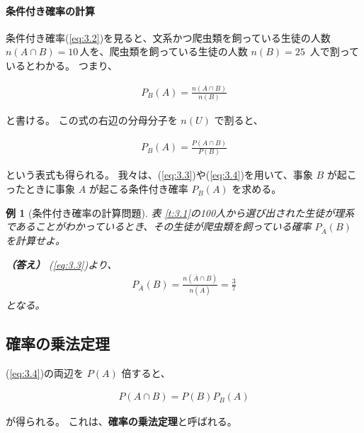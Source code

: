 \documentclass[12pt]{ltjsarticle}\usepackage{ifthen}\newcounter{enlarge}\setcounter{enlarge}{1}
\newtheorem{eg}{例}
\begin{document}
\paragraph{条件付き確率の計算}

条件付き確率(\ref{eq:3.2})を見ると、文系かつ爬虫類を飼っている生徒の人数 $n(A \cap B) = 10\,$人を、爬虫類を飼っている生徒の人数 $n(B) = 25\,$ 人で割っているとわかる。
つまり、
\begin{oframed}
  \begin{align}
    P_B (A) = \frac{n(A \cap B)}{n(B)} \label{eq:3.3}
  \end{align}
\end{oframed}
\noindent
と書ける。
この式の右辺の分母分子を $n(U)$ で割ると、
\begin{oframed}
  \begin{align}
    P_B (A) = \frac{P(A \cap B)}{P(B)} \label{eq:3.4}
  \end{align}
\end{oframed}
\noindent
という表式も得られる。
我々は、(\ref{eq:3.3})や(\ref{eq:3.4})を用いて、事象 $B$ が起こったときに事象 $A$ が起こる条件付き確率 $P_B (A)$ を求める。

\begin{eg}[条件付き確率の計算問題]
  表 \ref{t:3.1}の100人から選び出された生徒が理系であることがわかっているとき、その生徒が爬虫類を飼っている確率 $P_{\overline{A}} (B)$ を計算せよ。

  \textbf{（答え）}
  (\ref{eq:3.3})より、
  \begin{align}
    P_{\overline{A}} (B) = \frac{n(\overline{A} \cap B)}{n(\overline{A})} = \frac{3}{7} \label{eq:3.5}
  \end{align}
  となる。
\end{eg}

\subsection{確率の乗法定理}

(\ref{eq:3.4})の両辺を $P(A)$ 倍すると、
\begin{oframed}
  \begin{align}
    P(A \cap B) = P(B) P_B (A) \label{eq:3.6}
  \end{align}
\end{oframed}
\noindent
が得られる。
これは、\textbf{確率の乗法定理}と呼ばれる。
\end{document}

